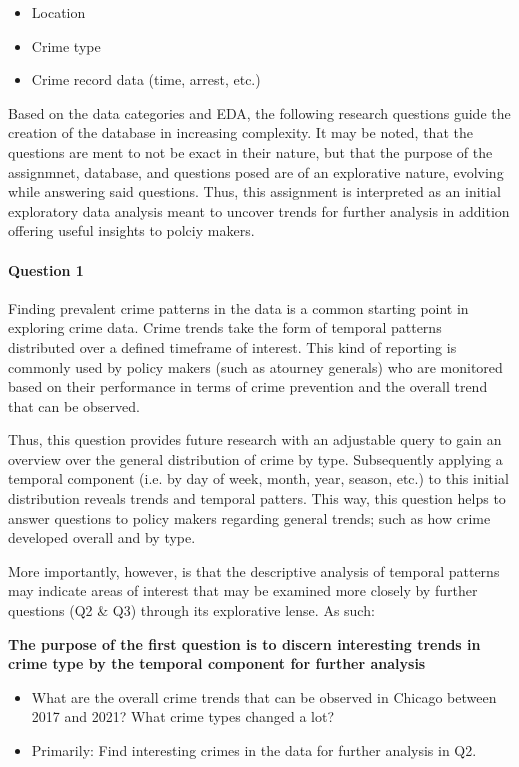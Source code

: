 \documentclass[a4paper]{article}
\begin{document}
\begin{itemize}
  \item Location
  \item Crime type
  \item Crime record data (time, arrest, etc.)
\end{itemize}

Based on the data categories and EDA, the following research questions guide the creation of the database in increasing complexity. It may be noted, that the questions are ment to not be exact in their nature, but that the purpose of the assignmnet, database, and questions posed are of an explorative nature, evolving while answering said questions. Thus, this assignment is interpreted as an initial exploratory data analysis meant to uncover trends for further analysis in addition offering useful insights to polciy makers. 

\paragraph{Question 1} Finding prevalent crime patterns in the data is a common starting point in exploring crime data. Crime trends take the form of temporal patterns distributed over a defined timeframe of interest. This kind of reporting is commonly used by policy makers (such as atourney generals) who are monitored based on their performance in terms of crime prevention and the overall trend that can be observed. 

Thus, this question provides future research with an adjustable query to gain an overview over the general distribution of crime by type. Subsequently applying a temporal component (i.e. by day of week,  month, year, season, etc.) to this initial distribution reveals trends and temporal patters. This way, this question helps to answer questions to policy makers regarding general trends; such as how crime developed overall and by type. 

More importantly, however, is that the descriptive analysis of temporal patterns may indicate areas of interest that may be examined more closely by further questions (Q2 \& Q3) through its explorative lense. As such:

\textbf{The purpose of the first question is to discern interesting trends in crime type by the temporal component for further analysis}
\begin{itemize}

  \item What are the overall crime trends that can be observed in Chicago between 2017 and 2021? What crime types changed a lot? 
    \item Primarily: Find interesting crimes in the data for further analysis in Q2.
\end{itemize}
\end{document}
